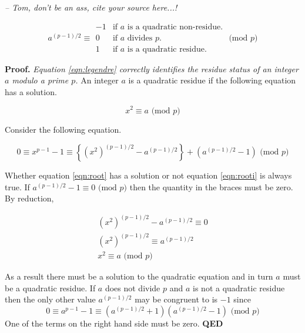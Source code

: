 \documentclass[b5paper]{book}
\begin{document}
\textit{-- Tom, don't be an ass, cite your source here...!}

\begin{equation}
a^{(p-1)/2} \equiv \begin{array}{rl}
                              -1 &  \mbox{if }a\mbox{ is a quadratic non-residue.} \\
                              0  &  \mbox{if }a\mbox{ divides }p\mbox{.} \\
                              1  &  \mbox{if }a\mbox{ is a quadratic residue}. 
                              \end{array} \mbox{ (mod }p\mbox{)}
\label{eqn:legendre}                              
\end{equation}

\textbf{Proof.} \textit{Equation \ref{eqn:legendre} correctly identifies the residue status of an integer $a$ modulo a prime $p$.}
An integer $a$ is a quadratic residue if the following equation has a solution.

\begin{equation}
x^2 \equiv a \mbox{ (mod }p\mbox{)}
\label{eqn:root}
\end{equation}

Consider the following equation.

\begin{equation}
0 \equiv x^{p-1} - 1 \equiv \left \lbrace \left (x^2 \right )^{(p-1)/2} - a^{(p-1)/2} \right \rbrace + \left ( a^{(p-1)/2} - 1 \right ) \mbox{ (mod }p\mbox{)}
\label{eqn:rooti}
\end{equation}

Whether equation \ref{eqn:root} has a solution or not equation \ref{eqn:rooti} is always true.  If $a^{(p-1)/2} - 1 \equiv 0 \mbox{ (mod }p\mbox{)}$
then the quantity in the braces must be zero.  By reduction,

\begin{eqnarray}
\left (x^2 \right )^{(p-1)/2} - a^{(p-1)/2} \equiv 0  \nonumber \\
\left (x^2 \right )^{(p-1)/2} \equiv a^{(p-1)/2} \nonumber \\
x^2 \equiv a \mbox{ (mod }p\mbox{)} 
\end{eqnarray}

As a result there must be a solution to the quadratic equation and in turn $a$ must be a quadratic residue.  If $a$ does not divide $p$ and $a$
is not a quadratic residue then the only other value $a^{(p-1)/2}$ may be congruent to is $-1$ since
\begin{equation}
0 \equiv a^{p - 1} - 1 \equiv (a^{(p-1)/2} + 1)(a^{(p-1)/2} - 1) \mbox{ (mod }p\mbox{)}
\end{equation}
One of the terms on the right hand side must be zero.  \textbf{QED}
\end{document}
